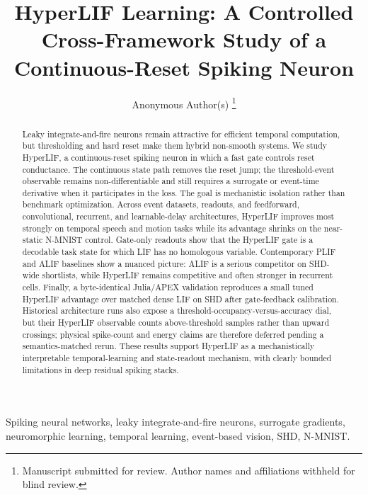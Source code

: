 \documentclass[journal]{IEEEtran}
\newcommand{\hlif}{HyperLIF}
\newcommand{\lif}{LIF}
\newcommand{\plif}{PLIF}
\newcommand{\alif}{ALIF}
\newcommand{\apex}{APEX}
\begin{document}
\title{HyperLIF Learning: A Controlled Cross-Framework Study of a Continuous-Reset Spiking Neuron}

\author{Anonymous Author(s)%
\thanks{Manuscript submitted for review. Author names and affiliations withheld for blind review.}}


\maketitle

\begin{abstract}
Leaky integrate-and-fire neurons remain attractive for efficient temporal computation, but thresholding and hard reset make them hybrid non-smooth systems. We study \hlif, a continuous-reset spiking neuron in which a fast gate controls reset conductance. The continuous state path removes the reset jump; the threshold-event observable remains non-differentiable and still requires a surrogate or event-time derivative when it participates in the loss. The goal is mechanistic isolation rather than benchmark optimization. Across event datasets, readouts, and feedforward, convolutional, recurrent, and learnable-delay architectures, \hlif{} improves most strongly on temporal speech and motion tasks while its advantage shrinks on the near-static N-MNIST control. Gate-only readouts show that the \hlif{} gate is a decodable task state for which \lif{} has no homologous variable. Contemporary \plif{} and \alif{} baselines show a nuanced picture: \alif{} is a serious competitor on SHD-wide shortlists, while \hlif{} remains competitive and often stronger in recurrent cells. Finally, a byte-identical Julia/\apex{} validation reproduces a small tuned \hlif{} advantage over matched dense \lif{} on SHD after gate-feedback calibration. Historical architecture runs also expose a threshold-occupancy-versus-accuracy dial, but their HyperLIF observable counts above-threshold samples rather than upward crossings; physical spike-count and energy claims are therefore deferred pending a semantics-matched rerun. These results support \hlif{} as a mechanistically interpretable temporal-learning and state-readout mechanism, with clearly bounded limitations in deep residual spiking stacks.
\end{abstract}

\begin{IEEEkeywords}
Spiking neural networks, leaky integrate-and-fire neurons, surrogate gradients, neuromorphic learning, temporal learning, event-based vision, SHD, N-MNIST.
\end{IEEEkeywords}
\end{document}
